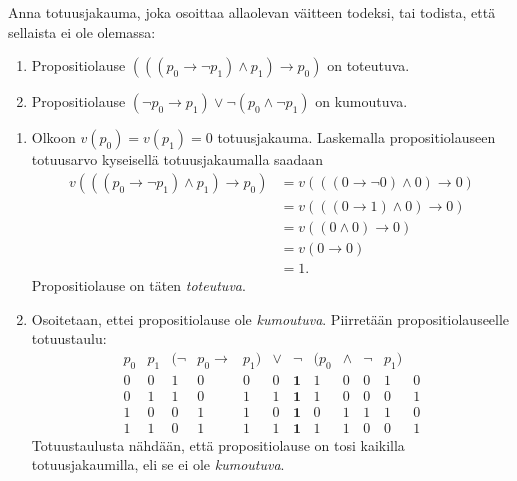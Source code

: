 \documentclass[12pt,a4paper]{article}
\begin{document}
\begin{exercise}
Anna totuusjakauma, joka osoittaa allaolevan väitteen todeksi, tai todista,
että sellaista ei ole olemassa:
\begin{enumerate}[label=\alph*), nosep]
\item Propositiolause \((((p_0 \rightarrow \neg p_1) \land p_1)
\rightarrow p_0)\) on toteutuva.

\item Propositiolause \((\neg p_0 \rightarrow p_1) \lor \neg(p_0
\land \neg p_1)\) on kumoutuva.
\end{enumerate}
\end{exercise}

\begin{solution}
\leavevmode\par
\begin{enumerate}[label=\alph*), nosep]
\item Olkoon \(v(p_0) = v(p_1) = 0\) totuusjakauma. Laskemalla
propositiolauseen totuusarvo kyseisellä totuusjakaumalla saadaan
\[
\begin{aligned}
v(((p_0 \rightarrow \neg p_1) \land p_1)\rightarrow p_0)
&= v(((0 \rightarrow \neg 0) \land 0) \rightarrow 0) \\
&= v(((0 \rightarrow 1) \land 0) \rightarrow 0) \\
&= v((0 \land 0) \rightarrow 0) \\
&= v(0 \rightarrow 0) \\
&= 1.
\end{aligned}
\]
Propositiolause on täten \emph{toteutuva}.

\item Osoitetaan, ettei propositiolause ole \emph{kumoutuva}. Piirretään
propositiolauseelle totuustaulu:
\[
\begin{array}{cc|cccccccccc}
p_0 & p_1 & (\neg & p_0 \rightarrow & p_1) & \boldsymbol{\lor} & \neg
& (p_0 & \land & \neg & p_1) \\
\hline
0 & 0 & 1 & 0 & 0 & 0 & \mathbf{1} & 1 & 0 & 0 & 1 & 0 \\
0 & 1 & 1 & 0 & 1 & 1 & \mathbf{1} & 1 & 0 & 0 & 0 & 1 \\
1 & 0 & 0 & 1 & 1 & 0 & \mathbf{1} & 0 & 1 & 1 & 1 & 0 \\
1 & 1 & 0 & 1 & 1 & 1 & \mathbf{1} & 1 & 1 & 0 & 0 & 1
\end{array}
\]
Totuustaulusta nähdään, että propositiolause on tosi kaikilla totuusjakaumilla,
eli se ei ole \emph{kumoutuva}.
\end{enumerate}
\end{solution}
\end{document}
